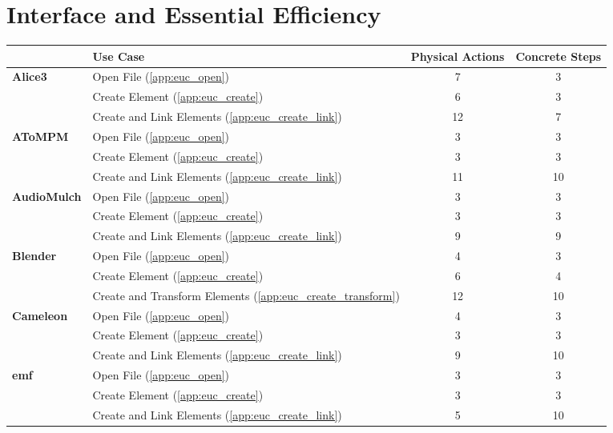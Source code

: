 \section{Interface and Essential Efficiency}

\begin{table*}[!htb]\centering
{}
\begin{tabularx}{\textwidth}{lXcc}\toprule
 & \textbf{Use Case} & \textbf{Physical Actions} & \textbf{Concrete Steps}\\
\midrule
\multirow{3}{*}{\textbf{Alice3}}
& Open File (\ref{app:euc_open})                       & 7  & 3 \\
& Create Element (\ref{app:euc_create})                & 6  & 3 \\
& Create and Link Elements (\ref{app:euc_create_link}) & 12 & 7 \\
\midrule
\multirow{3}{*}{\textbf{AToMPM}}
& Open File (\ref{app:euc_open})                       & 3  & 3 \\
& Create Element (\ref{app:euc_create})                & 3  & 3 \\
& Create and Link Elements (\ref{app:euc_create_link}) & 11 & 10 \\
\midrule
\multirow{3}{*}{\textbf{AudioMulch}}
& Open File (\ref{app:euc_open})                       & 3 & 3 \\
& Create Element (\ref{app:euc_create})                & 3 & 3 \\
& Create and Link Elements (\ref{app:euc_create_link}) & 9 & 9 \\
\midrule
\multirow{3}{*}{\textbf{Blender}}
& Open File (\ref{app:euc_open})        & 4 & 3 \\
& Create Element (\ref{app:euc_create}) & 6 & 4 \\
& Create and Transform Elements (\ref{app:euc_create_transform}) & 12 & 10 \\
\midrule
\multirow{3}{*}{\textbf{Cameleon}}
& Open File (\ref{app:euc_open})                       & 4 & 3 \\
& Create Element (\ref{app:euc_create})                & 3 & 3 \\
& Create and Link Elements (\ref{app:euc_create_link}) & 9 & 10 \\
\midrule
\multirow{3}{*}{\textbf{\ac{emf}}}
& Open File (\ref{app:euc_open})                       & 3 & 3 \\
& Create Element (\ref{app:euc_create})                & 3 & 3 \\
& Create and Link Elements (\ref{app:euc_create_link}) & 5 & 10 \\

\end{tabularx}
\end{table*}
